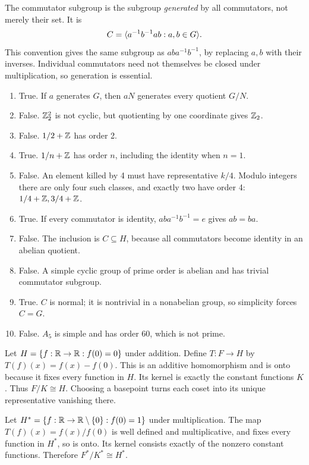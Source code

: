 The commutator subgroup is the subgroup \emph{generated} by all commutators, not merely their set. It is
\[C=\langle a^{-1}b^{-1}ab:a,b\in G\rangle.\]
This convention gives the same subgroup as $aba^{-1}b^{-1}$, by replacing $a,b$ with their inverses. Individual commutators need not themselves be closed under multiplication, so generation is essential.

\begin{enumerate}[label=(\alph*)]
\item True. If $a$ generates $G$, then $aN$ generates every quotient $G/N$.
\item False. $\mathbb{Z}_2^2$ is not cyclic, but quotienting by one coordinate gives $\mathbb{Z}_2$.
\item False. $1/2+\mathbb{Z}$ has order 2.
\item True. $1/n+\mathbb{Z}$ has order $n$, including the identity when $n=1$.
\item False. An element killed by 4 must have representative $k/4$. Modulo integers there are only four such classes, and exactly two have order 4: $1/4+\mathbb{Z},3/4+\mathbb{Z}$.
\item True. If every commutator is identity, $aba^{-1}b^{-1}=e$ gives $ab=ba$.
\item False. The inclusion is $C\subseteq H$, because all commutators become identity in an abelian quotient.
\item False. A simple cyclic group of prime order is abelian and has trivial commutator subgroup.
\item True. $C$ is normal; it is nontrivial in a nonabelian group, so simplicity forces $C=G$.
\item False. $A_5$ is simple and has order 60, which is not prime.
\end{enumerate}

Let $H=\{f:\mathbb{R}\to\mathbb{R}:f(0)=0\}$ under addition. Define $T:F\to H$ by $T(f)(x)=f(x)-f(0)$. This is an additive homomorphism and is onto because it fixes every function in $H$. Its kernel is exactly the constant functions $K$. Thus $F/K\cong H$. Choosing a basepoint turns each coset into its unique representative vanishing there.

Let $H^*=\{f:\mathbb{R}\to\mathbb{R}\setminus\{0\}:f(0)=1\}$ under multiplication. The map $T(f)(x)=f(x)/f(0)$ is well defined and multiplicative, and fixes every function in $H^*$, so is onto. Its kernel consists exactly of the nonzero constant functions. Therefore $F^*/K^*\cong H^*$.

